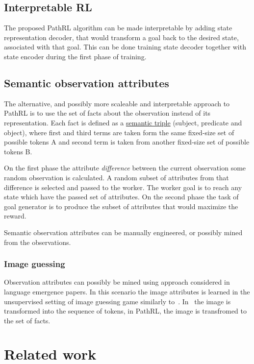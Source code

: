 \documentclass[acmsmall, nonacm]{acmart}
\begin{document}
\subsection{Interpretable RL}

The proposed PathRL algorithm can be made interpretable by adding state representation decoder, that would transform a goal back to the desired state, associated with that goal. This can be done training state decoder together with state encoder during the first phase of training.

\subsection{Semantic observation attributes}

The alternative, and possibly more scaleable and interpretable approach to PathRL is to use the set of facts about the observation instead of its representation. Each fact is defined as a \href{https://en.wikipedia.org/wiki/Semantic_triple}{semantic triple} (subject, predicate and object), where first and third terms are taken form the same fixed-size set of possible tokens A and second term is taken from another fixed-size set of possible tokens B.

On the first phase the attribute \textit{difference} between the current observation some random observation is calculated. A random subset of attributes from that difference is selected and passed to the worker. The worker goal is to reach any state which have the passed set of attributes. On the second phase the task of goal generator is to produce the subset of attributes that would maximize the reward.

Semantic observation attributes can be manually engineered, or possibly mined from the observations.

\subsubsection{Image guessing}

Observation attributes can possibly be mined using approach considered in language emergence papers. In this scenario the image attributes is learned in the unsupervised setting of image guessing game similarly to~\citet{Havrylov2017EmergenceOL}. In~\citet{Havrylov2017EmergenceOL} the image is transformed into the sequence of tokens, in PathRL, the image is transfromed to the set of facts.


\section{Related work}
\label{sec:related_work}
\end{document}
